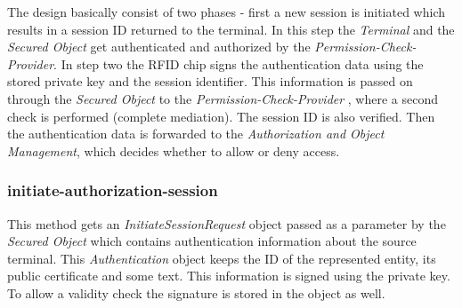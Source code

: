 \documentclass[12pt,a4paper,titlepage,oneside]{scrartcl}
\begin{document}
\begin{figure}[h]
    \centering
\end{figure}

The design basically consist of two phases - first a new session is initiated which results in a session ID returned to the terminal. In this step the \emph{Terminal} and the \emph{Secured Object} get authenticated and authorized by the \emph{Permission-Check-Provider}. In step two the RFID chip signs the authentication data using the stored private key and the session identifier. This information is passed on through the \emph{Secured Object} to the \emph{Permission-Check-Provider} , where a second check is performed (complete mediation). The session ID is also verified. Then the authentication data is forwarded to the \emph{Authorization and Object Management}, which decides whether to allow or deny access.

\subsubsection{initiate-authorization-session}
This method gets an \emph{InitiateSessionRequest} object passed as a parameter by the \emph{Secured Object} which contains authentication information about the source terminal. This \emph{Authentication} object keeps  the ID of the represented entity, its public certificate and some text. This information is signed using the private key. To allow a validity check the signature is stored in the object as well.
\end{document}
